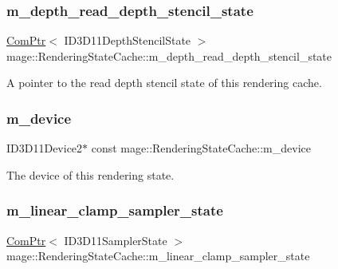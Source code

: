 \subsubsection{\texorpdfstring{m\+\_\+depth\+\_\+read\+\_\+depth\+\_\+stencil\+\_\+state}{m\_depth\_read\_depth\_stencil\_state}}
{\footnotesize\ttfamily \hyperlink{namespacemage_ae74f374780900893caa5555d1031fd79}{Com\+Ptr}$<$ I\+D3\+D11\+Depth\+Stencil\+State $>$ mage\+::\+Rendering\+State\+Cache\+::m\+\_\+depth\+\_\+read\+\_\+depth\+\_\+stencil\+\_\+state\hspace{0.3cm}{\ttfamily [private]}}

A pointer to the read depth stencil state of this rendering cache. \hypertarget{structmage_1_1_rendering_state_cache_ad1846bcede5c3e6c8ce631b504b45cdf}{}\label{structmage_1_1_rendering_state_cache_ad1846bcede5c3e6c8ce631b504b45cdf} 
\subsubsection{\texorpdfstring{m\+\_\+device}{m\_device}}
{\footnotesize\ttfamily I\+D3\+D11\+Device2$\ast$ const mage\+::\+Rendering\+State\+Cache\+::m\+\_\+device\hspace{0.3cm}{\ttfamily [private]}}

The device of this rendering state. \hypertarget{structmage_1_1_rendering_state_cache_a8086db2af33ea844744f3e81a4471af6}{}\label{structmage_1_1_rendering_state_cache_a8086db2af33ea844744f3e81a4471af6} 
\subsubsection{\texorpdfstring{m\+\_\+linear\+\_\+clamp\+\_\+sampler\+\_\+state}{m\_linear\_clamp\_sampler\_state}}
{\footnotesize\ttfamily \hyperlink{namespacemage_ae74f374780900893caa5555d1031fd79}{Com\+Ptr}$<$ I\+D3\+D11\+Sampler\+State $>$ mage\+::\+Rendering\+State\+Cache\+::m\+\_\+linear\+\_\+clamp\+\_\+sampler\+\_\+state\hspace{0.3cm}{\ttfamily [private]}}

